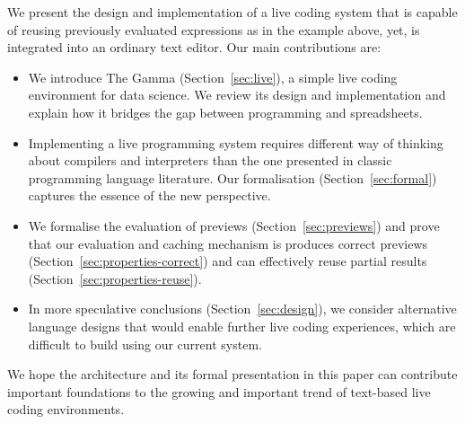 \documentclass[sigplan,10pt]{acmart}\settopmatter{printfolios=true,printccs=false,printacmref=false}
\theoremstyle{plain}
\theoremstyle{definition}
\begin{document}
We present the design and implementation of a live coding system that is capable
of reusing previously evaluated expressions as in the example above, yet, is integrated into an
ordinary text editor. Our main contributions are:

\begin{itemize}[itemsep=3pt]
\item We introduce The Gamma (Section~\ref{sec:live}), a simple live coding environment for
  data science. We review its design and implementation and explain how it 
  bridges the gap between programming and spreadsheets.

\item Implementing a live programming system requires different way of thinking about compilers
  and interpreters than the one presented in classic programming language literature. Our 
  formalisation (Section~\ref{sec:formal}) captures the essence of the new perspective.

\item We formalise the evaluation of previews (Section~\ref{sec:previews}) and prove that our
  evaluation and caching mechanism is produces correct previews (Section~\ref{sec:properties-correct}) 
  and can effectively reuse partial results (Section~\ref{sec:properties-reuse}).
  
\item In more speculative conclusions (Section~\ref{sec:design}), we consider alternative
  language designs that would enable further live coding experiences, which are difficult to
  build using our current system.
\end{itemize}

\noindent
We hope the architecture and its formal presentation in this paper can contribute important 
foundations to the growing and important trend of text-based live coding environments.

\end{document}
